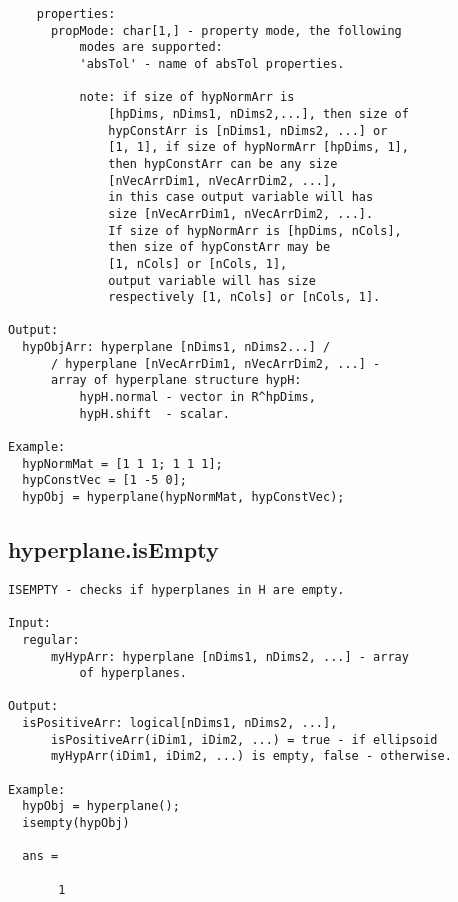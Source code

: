 \begin{verbatim}
    properties:
      propMode: char[1,] - property mode, the following
          modes are supported:
          'absTol' - name of absTol properties.

          note: if size of hypNormArr is
              [hpDims, nDims1, nDims2,...], then size of
              hypConstArr is [nDims1, nDims2, ...] or
              [1, 1], if size of hypNormArr [hpDims, 1],
              then hypConstArr can be any size
              [nVecArrDim1, nVecArrDim2, ...],
              in this case output variable will has
              size [nVecArrDim1, nVecArrDim2, ...].
              If size of hypNormArr is [hpDims, nCols],
              then size of hypConstArr may be
              [1, nCols] or [nCols, 1],
              output variable will has size
              respectively [1, nCols] or [nCols, 1].

Output:
  hypObjArr: hyperplane [nDims1, nDims2...] /
      / hyperplane [nVecArrDim1, nVecArrDim2, ...] -
      array of hyperplane structure hypH:
          hypH.normal - vector in R^hpDims,
          hypH.shift  - scalar.

Example:
  hypNormMat = [1 1 1; 1 1 1];
  hypConstVec = [1 -5 0];
  hypObj = hyperplane(hypNormMat, hypConstVec);
\end{verbatim}
\subsection{\texorpdfstring{hyperplane.isEmpty}{isEmpty}}\label{method:hyperplane.isEmpty}
\begin{verbatim}
ISEMPTY - checks if hyperplanes in H are empty.

Input:
  regular:
      myHypArr: hyperplane [nDims1, nDims2, ...] - array
          of hyperplanes.

Output:
  isPositiveArr: logical[nDims1, nDims2, ...],
      isPositiveArr(iDim1, iDim2, ...) = true - if ellipsoid
      myHypArr(iDim1, iDim2, ...) is empty, false - otherwise.

Example:
  hypObj = hyperplane();
  isempty(hypObj)

  ans =

       1
\end{verbatim}
